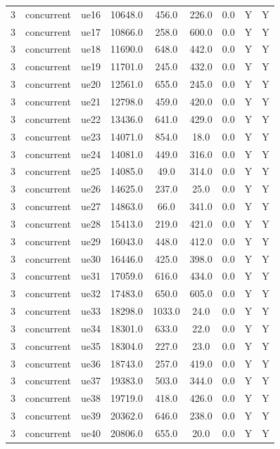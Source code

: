 \begin{table}[ht]
\begin{tabular}{|c|c|c|c|c|c|c|c|c|}
3 & concurrent & ue16 & 10648.0 & 456.0 & 226.0 & 0.0 & Y & Y \\
3 & concurrent & ue17 & 10866.0 & 258.0 & 600.0 & 0.0 & Y & Y \\
3 & concurrent & ue18 & 11690.0 & 648.0 & 442.0 & 0.0 & Y & Y \\
3 & concurrent & ue19 & 11701.0 & 245.0 & 432.0 & 0.0 & Y & Y \\
3 & concurrent & ue20 & 12561.0 & 655.0 & 245.0 & 0.0 & Y & Y \\
3 & concurrent & ue21 & 12798.0 & 459.0 & 420.0 & 0.0 & Y & Y \\
3 & concurrent & ue22 & 13436.0 & 641.0 & 429.0 & 0.0 & Y & Y \\
3 & concurrent & ue23 & 14071.0 & 854.0 & 18.0 & 0.0 & Y & Y \\
3 & concurrent & ue24 & 14081.0 & 449.0 & 316.0 & 0.0 & Y & Y \\
3 & concurrent & ue25 & 14085.0 & 49.0 & 314.0 & 0.0 & Y & Y \\
3 & concurrent & ue26 & 14625.0 & 237.0 & 25.0 & 0.0 & Y & Y \\
3 & concurrent & ue27 & 14863.0 & 66.0 & 341.0 & 0.0 & Y & Y \\
3 & concurrent & ue28 & 15413.0 & 219.0 & 421.0 & 0.0 & Y & Y \\
3 & concurrent & ue29 & 16043.0 & 448.0 & 412.0 & 0.0 & Y & Y \\
3 & concurrent & ue30 & 16446.0 & 425.0 & 398.0 & 0.0 & Y & Y \\
3 & concurrent & ue31 & 17059.0 & 616.0 & 434.0 & 0.0 & Y & Y \\
3 & concurrent & ue32 & 17483.0 & 650.0 & 605.0 & 0.0 & Y & Y \\
3 & concurrent & ue33 & 18298.0 & 1033.0 & 24.0 & 0.0 & Y & Y \\
3 & concurrent & ue34 & 18301.0 & 633.0 & 22.0 & 0.0 & Y & Y \\
3 & concurrent & ue35 & 18304.0 & 227.0 & 23.0 & 0.0 & Y & Y \\
3 & concurrent & ue36 & 18743.0 & 257.0 & 419.0 & 0.0 & Y & Y \\
3 & concurrent & ue37 & 19383.0 & 503.0 & 344.0 & 0.0 & Y & Y \\
3 & concurrent & ue38 & 19719.0 & 418.0 & 426.0 & 0.0 & Y & Y \\
3 & concurrent & ue39 & 20362.0 & 646.0 & 238.0 & 0.0 & Y & Y \\
3 & concurrent & ue40 & 20806.0 & 655.0 & 20.0 & 0.0 & Y & Y \\

\end{tabular}
\end{table}
